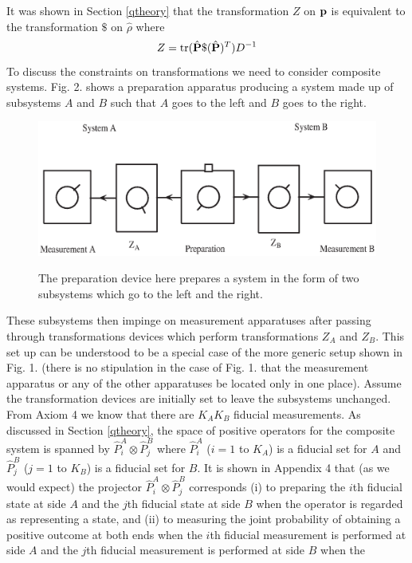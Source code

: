 \documentclass[12pt]{article}
\begin{document}
It was shown in Section \ref{qtheory}
that the transformation $Z$ on ${\bf p}$ is
equivalent to the transformation $\$ $ on $\hat{\rho}$ where
\begin{equation}\label{transZprho}
Z={\rm tr}(\hat{\bf P}\$(\hat{\bf P})^T) D^{-1}
\end{equation}
To discuss the constraints on transformations we need to
consider composite systems.
Fig. 2. shows a preparation apparatus producing a system made
up of subsystems $A$ and $B$ such that $A$ goes to the left and $B$ goes
to the right.
\begin{figure}[t]
{\includegraphics{qaxiomf2.eps}}
\caption{The preparation device here prepares a system in the form of
two subsystems which go to the left and the right.}
\end{figure}
These subsystems then impinge on measurement
apparatuses after passing through transformations devices which perform
transformations $Z_A$ and $Z_B$.  This set up
can be understood to be a special case of the more generic setup shown
in Fig. 1. (there is no stipulation in the case of Fig. 1. that the
measurement apparatus or any of the other apparatuses be located only
in one place).  Assume the
transformation devices are initially set to leave the subsystems
unchanged.  From Axiom 4 we know that there are $K_AK_B$ fiducial
measurements. As discussed in Section \ref{qtheory}, the space of
positive operators for the composite system is spanned by
$\hat{P}^A_i\otimes\hat{P}^B_j$ where $\hat{P}^A_i$ ($i=1$ to $K_A$) is
a fiducial set for $A$ and $\hat{P}^B_j$ ($j=1$ to $K_B$)
is a fiducial set for $B$. It is shown in Appendix 4 that (as we would
expect) the projector $\hat{P}^A_i\otimes\hat{P}^B_j$ corresponds
(i) to preparing the $i$th fiducial state at side $A$ and the $j$th
fiducial state at side $B$ when the operator is regarded as representing a
state, and
(ii) to measuring the joint probability of obtaining a positive outcome
at both ends when the $i$th fiducial measurement is performed at side
$A$ and the $j$th fiducial measurement is performed at side $B$ when the
\end{document}
